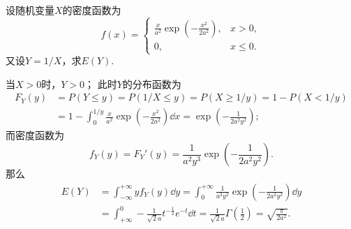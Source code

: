 \begin{example}
设随机变量\(X\)的密度函数为\begin{equation*}
	f(x) = \left\{ \begin{array}{cl}
		\frac{x}{a^2} \exp(-\frac{x^2}{2a^2}), & x>0, \\
		0, & x \leq 0.
	\end{array} \right.
\end{equation*}
又设\(Y = 1/X\)，求\(E(Y)\).
\begin{solution}
当\(X>0\)时，\(Y>0\)；
此时\(Y\)的分布函数为\begin{equation*}\begin{aligned}
	F_Y(y)
	&= P(Y \leq y)
	= P(1/X \leq y)
	= P(X \geq 1/y)
	= 1 - P(X < 1/y) \\
	&= 1 - \int_0^{1/y} \frac{x}{a^2} \exp(-\frac{x^2}{2a^2}) \dd{x}
	= \exp(-\frac{1}{2a^2y^2});
\end{aligned}\end{equation*}
而密度函数为\begin{equation*}
	f_Y(y) = F_Y'(y)
	= \frac{1}{a^2 y^3} \exp(-\frac{1}{2a^2y^2}).
\end{equation*}
那么\begin{align*}
	E(Y)
	&= \int_{-\infty}^{+\infty} y f_Y(y) \dd{y}
	= \int_0^{+\infty} \frac{1}{a^2 y^2} \exp(-\frac{1}{2a^2y^2}) \dd{y} \\
	&= \int_{+\infty}^0 -\frac{1}{\sqrt{2} a} t^{-\frac{1}{2}} e^{-t} \dd{t}
	= \frac{1}{\sqrt{2} a} \Gamma\left(\frac{1}{2}\right)
	= \sqrt{\frac{\pi}{2a^2}}.
\end{align*}
\end{solution}
\end{example}

